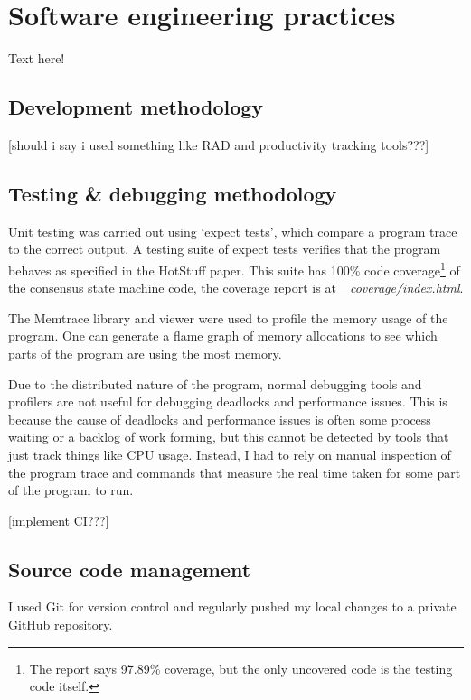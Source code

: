 \section{Software engineering practices}
Text here!

\subsection{Development methodology}
[should i say i used something like RAD and productivity tracking tools???]
\subsection{Testing \& debugging methodology} \label{testing}
Unit testing was carried out using `expect tests', which compare a program trace to the correct output. A testing suite of expect tests verifies that the program behaves as specified in the HotStuff paper. This suite has 100\% code coverage\footnote{The report says 97.89\% coverage, but the only uncovered code is the testing code itself.} of the consensus state machine code, the coverage report is at \textit{\_coverage/index.html}.

The Memtrace library and viewer were used to profile the memory usage of the program. One can generate a flame graph of memory allocations to see which parts of the program are using the most memory.


Due to the distributed nature of the program, normal debugging tools and profilers are not useful for debugging deadlocks and performance issues. This is because the cause of deadlocks and performance issues is often some process waiting or a backlog of work forming, but this cannot be detected by tools that just track things like CPU usage. Instead, I had to rely on manual inspection of the program trace and commands that measure the real time taken for some part of the program to run.

[implement CI???]
\subsection{Source code management}
I used Git for version control and regularly pushed my local changes to a private GitHub repository.
